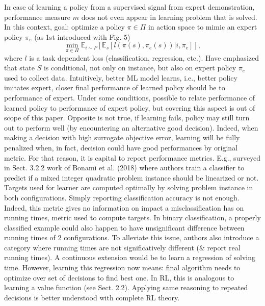 \documentclass{article}
\begin{document}
\begin{itemize}
\begin{itemize}
        In case of learning a policy from a supervised signal from expert demonstration, performance measure $m$ does not even appear in learning problem that is solved. In this context, goal: optimize a policy $\pi\in\Pi$ in action space to mimic an expert policy $\pi_e$ (as 1st introduced with Fig. 5)
        \begin{equation*}
            \min_{\pi\in\Pi} \mathbb{E}_{i\sim P}[\mathbb{E}_s[l(\pi(s),\pi_e(s))|i,\pi_e]],
        \end{equation*}
        where $l$ is a task dependent loss (classification, regression, etc.). Have emphasized that state $S$ is conditional, not only on instance, but also on expert policy $\pi_e$ used to collect data. Intuitively, better ML model learns, i.e., better policy imitates expert, closer final performance of learned policy should be to performance of expert. Under some conditions, possible to relate performance of learned policy to performance of expert policy, but covering this aspect is out of scope of this paper. Opposite is not true, if learning fails, policy may still turn out to perform well (by encountering an alternative good decision). Indeed, when making a decision with high surrogate objective error, learning will be fully penalized when, in fact, decision could have good performances by original metric. For that reason, it is capital to report performance metrics. E.g., surveyed in Sect. 3.2.2 work of Bonami et al. (2018) where authors train a classifier to predict if a mixed integer quadratic problem instance should be linearized or not. Targets used for learner are computed optimally by solving problem instance in both configurations. Simply reporting classification accuracy is not enough. Indeed, this metric gives no information on impact a misclassification has on running times, metric used to compute targets. In binary classification, a properly classiﬁed example could also happen to have unsignificant difference between running times of 2 configurations. To alleviate this issue, authors also introduce a category where running times are not significatively different (\& report real running times). A continuous extension would be to learn a regression of solving time. However, learning this regression now means: final algorithm needs to optimize over set of decisions to find best one. In RL, this is analogous to learning a value function (see Sect. 2.2). Applying same reasoning to repeated decisions is better understood with complete RL theory.


\end{itemize}
\end{itemize}
\end{document}
